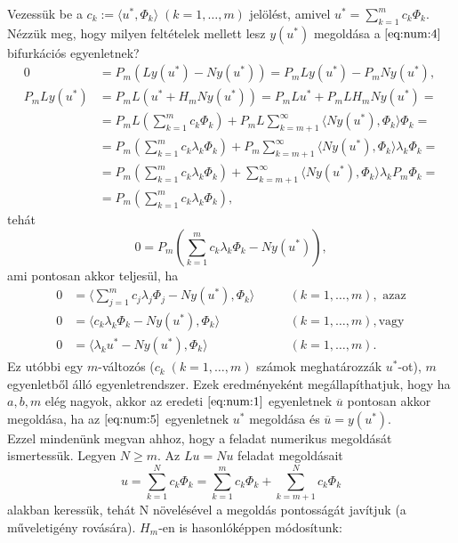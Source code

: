 \documentclass[oneside, titlepage, 12pt, a4paper]{report}
\begin{document}
Vezessük be a $c_k := \langle u^*, \Phi_k \rangle \;(k = 1, \dots, m)$ jelölést, amivel $u^* = \sum_{k = 1}^m c_k \Phi_k$. Nézzük meg, hogy milyen feltételek mellett lesz $y(u^*)$ megoldása a $\eqref{eq:num:4}$ bifurkációs egyenletnek?
\begin{align*}
0 &= P_m(L y(u^*) - N y(u^*)) = P_m L y(u^*) - P_m N y(u^*), \\
P_m L y(u^*) &= P_m L (u^* + H_m N y(u^*)) = P_m L u^* + P_m L H_m N y(u^*) = \\
 &= P_m L (\sum_{k = 1}^m c_k\Phi_k) + P_m L \sum_{k = m+1}^\infty \langle N y(u^*), \Phi_k \rangle \Phi_k = \\
 &= P_m (\sum_{k = 1}^m c_k \lambda_k \Phi_k) + P_m \sum_{k = m + 1}^\infty \langle N y(u^*), \Phi_k \rangle \lambda_k \Phi_k = \\
 &= P_m (\sum_{k = 1}^m c_k \lambda_k \Phi_k) + \sum_{k = m + 1}^\infty \langle N y(u^*), \Phi_k \rangle \lambda_k P_m \Phi_k = \\
 &= P_m (\sum_{k = 1}^m c_k \lambda_k \Phi_k),
\end{align*}
tehát
\begin{equation*}
0 = P_m (\sum_{k = 1}^m c_k \lambda_k \Phi_k - N y(u^*)),
\end{equation*}
ami pontosan akkor teljesül, ha
\begin{align}
0 &= \langle \sum_{j = 1}^m c_j \lambda_j \Phi_j - N y(u^*), \Phi_k \rangle \qquad &(k = 1, \dots, m), \text{ azaz} \nonumber \\
0 &= \langle c_k \lambda_k \Phi_k - N y(u^*), \Phi_k \rangle \qquad &(k = 1, \dots, m), \text{vagy} \nonumber \\
0 &= \langle \lambda_k u^* - N y(u^*), \Phi_k \rangle \qquad &(k = 1, \dots, m). \label{eq:num:5}
\end{align}
Ez utóbbi egy $m$-változós ($c_k \; (k = 1, \dots, m)$ számok meghatározzák $u^*$-ot), $m$ egyenletből álló egyenletrendszer. Ezek eredményeként megállapíthatjuk, hogy ha $a, b, m$ elég nagyok, akkor az eredeti $\eqref{eq:num:1}$ egyenletnek $\overline{u}$ pontosan akkor megoldása, ha az $\eqref{eq:num:5}$ egyenletnek $u^*$ megoldása és $\overline{u} = y(u^*)$. \\
Ezzel mindenünk megvan ahhoz, hogy a feladat numerikus megoldását ismertessük. Legyen $N \geq m$. Az $Lu = Nu$ feladat megoldásait
\begin{equation*}
u = \sum_{k = 1}^N c_k \Phi_k = \sum_{k = 1}^m c_k \Phi_k + \sum_{k = m+1}^N c_k \Phi_k
\end{equation*}
alakban keressük, tehát N növelésével a megoldás pontosságát javítjuk (a műveletigény rovására). $H_m$-en is hasonlóképpen módosítunk:
\end{document}
